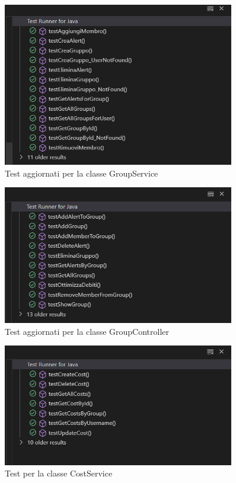 \begin{figure}[H]
    \centering
    \includegraphics[width=0.9\textwidth]{images/GroupServiceTest_iter2.png}
    \caption{Test aggiornati per la classe GroupService}
    \label{fig:GroupServiceTest_iter2}
\end{figure}

\begin{figure}[H]
    \centering
    \includegraphics[width=0.9\textwidth]{images/GroupControllerTest_iter2.png}
    \caption{Test aggiornati per la classe GroupController}
    \label{fig:GroupControllerTest_iter2}
\end{figure}

\begin{figure}[H]
    \centering
    \includegraphics[width=0.9\textwidth]{images/CostServiceTest_iter2.png}
    \caption{Test per la classe CostService}
    \label{fig:GroupControllerTest_iter2}
\end{figure}

